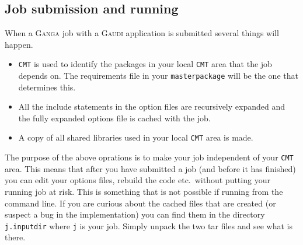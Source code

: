 \documentclass{howto}
\def\ganga {\textsc{Ganga}\xspace}
\def\gaudi {\textsc{Gaudi}\xspace}
\begin{document}
\subsection{Job submission and running}
\label{sec:GaudiConfigAndRun}
When a \ganga job with a \gaudi application is submitted several things will
happen.
\begin{itemize}
\item \texttt{CMT} is used to identify the packages in your local \texttt{CMT}
  area that the job depends on. The requirements file in your
  \texttt{masterpackage} will be the one that determines this.
\item All the include statements in the option files are recursively expanded
  and the fully expanded options file is cached with the job.
\item A copy of all shared libraries used in your local \texttt{CMT} area is
  made.
\end{itemize}
The purpose of the above oprations is to make your job independent of your
\texttt{CMT} area. This means that after you have submitted a job (and before
it has finished) you can edit your options files, rebuild the code etc.\
without putting your running job at risk. This is something that is not
possible if running from the command line. If you are curious about the cached
files that are created (or suspect a bug in the implementation) you can find
them in the directory \texttt{j.inputdir} where \texttt{j} is your job. Simply 
unpack the two tar files and see what is there.
\end{document}
